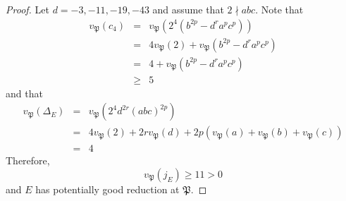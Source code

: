 \documentclass[10pt,a4paper]{amsart}
\newcommand {\mfp}{{\mathfrak{P}}}
\begin{document}
\begin{proof}
   Let $d=-3,-11,-19,-43$ and assume that $2\nmid abc$. Note that 
  \begin{eqnarray*}
    v_{\mfp}(c_4)&=&v_{\mfp}(2^4(b^{2p}-d^ra^pc^p))\\
    &=&4v_{\mfp}(2)+v_{\mfp}(b^{2p}-d^ra^pc^p)\\
    &=&4+v_\mfp(b^{2p}-d^ra^pc^p)\\
    &\ge& 5
\end{eqnarray*}and that
    \begin{eqnarray*}
    v_{\mfp}(\Delta_E)&=& v_{\mfp}(2^4d^{2r}(abc)^{2p})\\
    &=&4v_{\mfp}(2)+2rv_{\mfp}(d)+2p(v_{\mfp}(a)+v_{\mfp}(b)+v_{\mfp}(c))\\
    &=&4
    \end{eqnarray*}Therefore,$$v_{\mfp}(j_E)\ge 11>0$$and $E$ has potentially good reduction at $\mfp$.
\end{proof}
\end{document}
